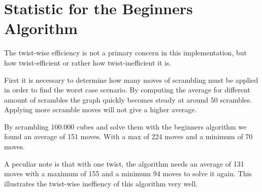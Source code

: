 \section{Statistic for the Beginners Algorithm}
The twist-wise efficiency is not a primary concern in this implementation, but how twist-efficient or rather how twist-inefficient it is. 

First it is necessary to determine how many moves of scrambling must be applied in order to find the worst case scenario. By computing the average for different amount of scrambles the graph quickly becomes steady at around 50 scrambles. Applying more scramble moves will not give a higher average. 

By scrambling 100.000 cubes and solve them with the beginners algorithm we found an average of 151 moves. With a max of 224 moves and a minimum of 70 moves. 

A peculiar note is that with one twist, the algorithm needs an average of 131 moves with a maximum of 155 and a minimum 94 moves to solve it again.
This illustrates the twist-wise ineffiency of this algorithm very well.